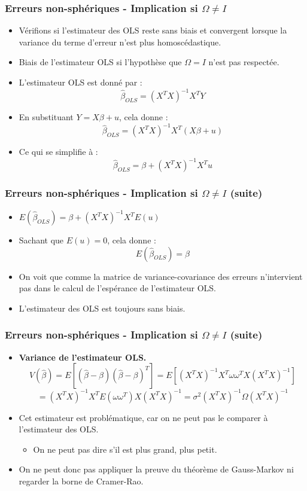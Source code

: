 \documentclass{beamer}
\begin{document}
\begin{frame}
\frametitle{Erreurs non-sphériques - Implication si \( \Omega \neq I \)}
\begin{itemize}
    \item Vérifions si l’estimateur des OLS reste sans biais et convergent lorsque la variance du terme d’erreur n’est plus homoscédastique.
    \item Biais de l’estimateur OLS si l’hypothèse que \( \Omega = I \) n’est pas respectée.
    \item L’estimateur OLS est donné par :
    \[
    \hat{\beta}_{OLS} = (X^T X)^{-1} X^T Y
    \]
    \item En substituant \( Y = X \beta + u \), cela donne :
    \[
    \hat{\beta}_{OLS} = (X^T X)^{-1} X^T \left( X \beta + u \right)
    \]
    \item Ce qui se simplifie à :
    \[
    \hat{\beta}_{OLS} = \beta + (X^T X)^{-1} X^T u
    \]
\end{itemize}
\end{frame}

\begin{frame}
\frametitle{Erreurs non-sphériques - Implication si \( \Omega \neq I \) (suite)}
\begin{itemize}
    \item \( E(\hat{\beta}_{OLS}) = \beta + (X^T X)^{-1} X^T E(u) \)
    \item Sachant que \( E(u) = 0 \), cela donne :
    \[
    E(\hat{\beta}_{OLS}) = \beta
    \]
    \item On voit que comme la matrice de variance-covariance des erreurs n’intervient pas dans le calcul de l’espérance de l’estimateur OLS.
    \item L’estimateur des OLS est toujours sans biais.
\end{itemize}
\end{frame}

\begin{frame}
\frametitle{Erreurs non-sphériques - Implication si \( \Omega \neq I \) (suite)}
\begin{itemize}
    \item \textbf{Variance de l’estimateur OLS.}
    \[
    V(\hat{\beta}) = E\left[ (\hat{\beta} - \beta)(\hat{\beta} - \beta)^T \right]
    = E\left[ (X^T X)^{-1} X^T \omega \omega^T X (X^T X)^{-1} \right]
    \]
    \[
    = (X^T X)^{-1} X^T E(\omega \omega^T) X (X^T X)^{-1}
    = \sigma^2 (X^T X)^{-1} \Omega (X^T X)^{-1}
    \]
    \item Cet estimateur est problématique, car on ne peut pas le comparer à l’estimateur des OLS.
    \begin{itemize}
        \item On ne peut pas dire s’il est plus grand, plus petit.
    \end{itemize}
    \item On ne peut donc pas appliquer la preuve du théorème de Gauss-Markov ni regarder la borne de Cramer-Rao.
\end{itemize}
\end{frame}
\end{document}
